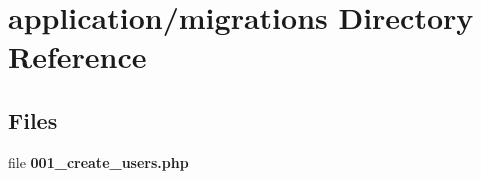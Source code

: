 \section{application/migrations Directory Reference}
\label{dir_cacda8817622871355f8fefc72cc772c}
\subsection*{Files}
\begin{DoxyCompactItemize}
\item 
file {\bf 001\-\_\-create\-\_\-users.\-php}
\end{DoxyCompactItemize}
